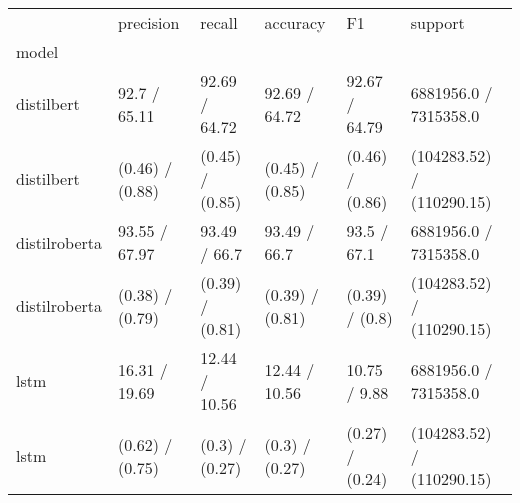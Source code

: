 \begin{tabular}{llllll}
\toprule
{} &        precision &           recall &         accuracy &               F1 &                    support \\
model         &                  &                  &                  &                  &                            \\
\midrule
distilbert    &     92.7 / 65.11 &    92.69 / 64.72 &    92.69 / 64.72 &    92.67 / 64.79 &      6881956.0 / 7315358.0 \\
distilbert    &  (0.46) / (0.88) &  (0.45) / (0.85) &  (0.45) / (0.85) &  (0.46) / (0.86) &  (104283.52) / (110290.15) \\
distilroberta &    93.55 / 67.97 &     93.49 / 66.7 &     93.49 / 66.7 &      93.5 / 67.1 &      6881956.0 / 7315358.0 \\
distilroberta &  (0.38) / (0.79) &  (0.39) / (0.81) &  (0.39) / (0.81) &   (0.39) / (0.8) &  (104283.52) / (110290.15) \\
lstm          &    16.31 / 19.69 &    12.44 / 10.56 &    12.44 / 10.56 &     10.75 / 9.88 &      6881956.0 / 7315358.0 \\
lstm          &  (0.62) / (0.75) &   (0.3) / (0.27) &   (0.3) / (0.27) &  (0.27) / (0.24) &  (104283.52) / (110290.15) \\
\bottomrule
\end{tabular}

